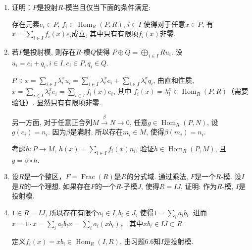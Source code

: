\begin{enumerate}
    \item[6.6] 证明：$P$是投射$R$-模当且仅当下面的条件满足:\par
        存在元素$e_i\in P$, $f_i\in \operatorname{Hom}_R(P,R)$, $i\in I$
        使得对于任意$x\in P$, 有$x=\sum\limits_{i\in I}f_i(x)e_i$成立, 
        其中只有有限项$f_i(x)$非零.
    \item[\textbf{证明:}]
        若$P$是投射模, 则存在$R$-模$Q$使得
        $P\oplus Q=\bigoplus\limits_{i\in I}Ru_i$. 
        设$u_i=e_i+q_i, i\in I, e_i\in P, q_i\in Q$.\par
        $P\ni x=\sum\limits_{i\in I} \lambda_i^xu_i=\sum\limits_{i\in I} \lambda_i^xe_i+\sum\limits_{i\in I} \lambda_i^xq_i$, 由直和性质, $x=\sum\limits_{i\in I} \lambda_i^xe_i=\sum\limits_{i\in I} f_i(x)e_i$, 其中
        $f_i(x)=\lambda_i^x\in \operatorname{Hom}_R(P,R)$（需要验证）. 
        显然只有有限项非零.\par
        另一方面, 对于任意正合列$M\stackrel{\beta}{\rightarrow} N\rightarrow 0$, 
        任意$g\in \operatorname{Hom}_R(P,N)$, 设$g(e_i)=n_i$. 
        因为$\beta$是满射, 所以存在$m_i\in M$, 使得$\beta(m_i)=n_i$. \par
        考虑$h:P\rightarrow M$, $h(x)=\sum\limits_{i\in I}f_i(x)n_i$, 
        验证$h\in \operatorname{Hom}_R(P,M)$, 且$g=\beta\circ h$.

    \item[6.7] 设$R$是一个整区，$F=\operatorname{Frac}(R)$是$R$的分式域. 
        通过乘法, $F$是一个$R$-模. 设$I$是$R$的一个理想. 
        如果存在$F$的一个$R$-子模$J$, 使得$R=IJ$, 证明: 作为$R$-模, $I$是投射模.
    \item[\textbf{证明:}]
        $1\in R=IJ$, 所以存在有限个$a_i\in I, b_i\in J$, 
        使得$1=\sum\limits_i a_ib_i$. 
        进而$x=1\cdot x=\sum\limits_i a_ib_ix=\sum\limits_i a_i(xb_i)$， 
        其中$xb_i\in IJ\subset R$.\par
        定义$f_i(x)=xb_i\in \operatorname{Hom}_R(I,R)$, 
        由习题6.6知$I$是投射模.
        

\end{enumerate}

